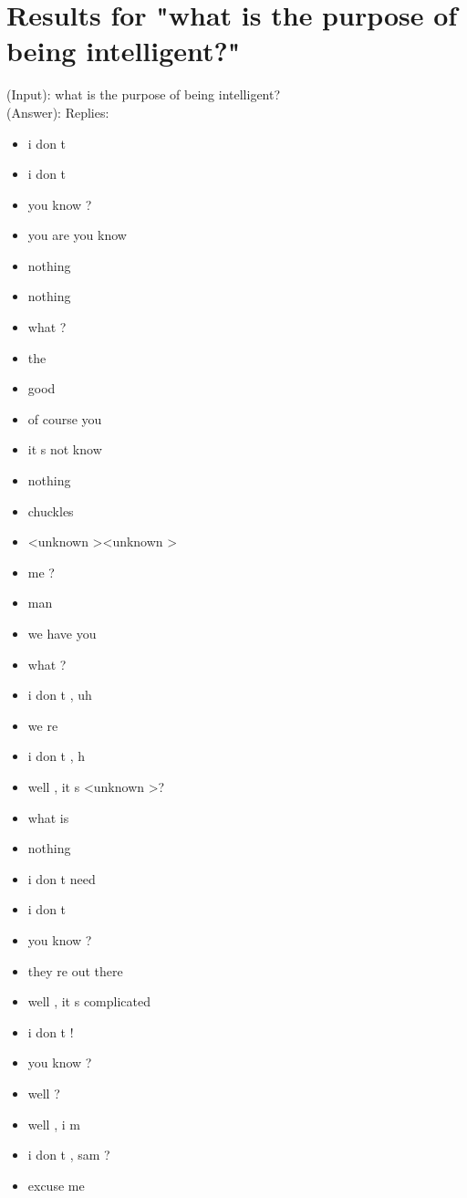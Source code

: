 \section{Results for "what is the purpose of being intelligent?"}
\label{apendix:result3:Beam-search-200:OpenSubtitle}
(Input): what is the purpose of being intelligent?\\
(Answer): Replies:
\begin{multicols}{4}
	\begin{itemize}[noitemsep]
		\item i don t
		\item i don t
		\item you know ?
		\item you are you know
		\item nothing
		\item nothing
		\item what ?
		\item the
		\item good
		\item of course you
		\item it s not know
		\item nothing
		\item chuckles
		\item \textless unknown \textgreater \textless unknown \textgreater
		\item me ?
		\item man
		\item we have you
		\item what ?
		\item i don t , uh
		\item we re
		\item i don t , h
		\item well , it s \textless unknown \textgreater ?
		\item what is
		\item nothing
		\item i don t need
		\item i don t
		\item you know ?
		\item they re out there
		\item well , it s complicated
		\item i don t !
		\item you know ?
		\item well ?
		\item well , i m
		\item i don t , sam ?
		\item excuse me

\end{itemize}
\end{multicols}
